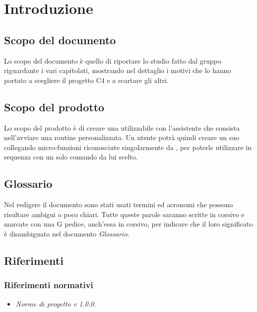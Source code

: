 \clearpage
\section{Introduzione}
\label{sec:intro}
    \subsection{Scopo del documento}
    Lo scopo del documento è quello di riportare lo studio fatto dal gruppo riguardante i vari capitolati, mostrando nel dettaglio i motivi che lo hanno portato a scegliere il progetto C4 e a scartare gli altri.
    
    \subsection{Scopo del prodotto}
    Lo scopo del prodotto è di creare una  utilizzabile con l'assistente  che consista nell'avviare una routine personalizzata. Un utente potrà quindi creare un suo  collegando micro-funzioni riconosciute singolarmente da , per poterle utilizzare in sequenza con un solo comando da lui scelto.
    
    \subsection{Glossario}
    Nel redigere il documento sono stati usati termini ed acronomi che possono risultare ambigui o poco chiari. Tutte queste parole saranno scritte in corsivo e marcate con una G pedice, anch'essa in corsivo, per indicare che il loro significato è disambiguato nel documento \emph{Glossario}.
    
    \subsection{Riferimenti}
    
    \subsubsection{Riferimenti normativi}
    \begin{itemize}
        \item \emph{Norme di progetto v 1.0.0}. %
    \end{itemize}
    
